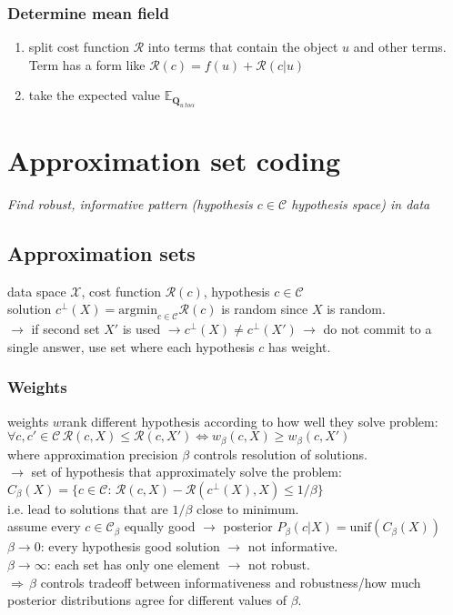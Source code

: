 \documentclass[9pt,parskip]{scrartcl}
\begin{document}
\begin{multicols*}{4}
\subsubsection*{Determine mean field}
\begin{enumerate}
	\item split cost function $\mathcal{R}$ into terms that contain the object $u$ and other terms. Term has a form like $\mathcal{R}(c) = f(u) + \mathcal{R}(c|u)$
	\item take the expected value $\mathbb{E}_{\mathbf{Q}_{u \ to \alpha}}$
\end{enumerate}
\section*{Approximation set coding}
\textit{Find robust, informative pattern (hypothesis $c\in \mathcal{C}$ hypothesis space) in data }
\subsection*{Approximation sets}
data space $\mathcal{X}$, cost function $\mathcal{R}(c)$, hypothesis $c\in \mathcal{C}$ \\
solution $c^{\bot}(X) = \text{argmin}_{c \in \mathcal{C}} \mathcal{R}(c)$ is random since $X$ is random. \\
$\to$ if second set $X'$ is used $\to c^{\bot}(X) \neq c^{\bot}(X') \, \to$ do not commit to a single answer, use set where each hypothesis $c$ has weight. \\
\subsubsection*{Weights}
weights $w$rank different hypothesis according to how well they solve problem: \\
$\forall c, c' \in \mathcal{C} \, \mathcal{R}(c,X) \leq \mathcal{R}(c,X') \Leftrightarrow w_{\beta}(c,X) \geq w_{\beta}(c,X')$ \\
where approximation precision $\beta$ controls resolution of solutions. \\
$\to$ set of hypothesis that approximately solve the problem: \\$C_{\beta}(X)= \{c \in \mathcal{C} : \, \mathcal{R} (c,X) - \mathcal{R}(c^{\bot}(X),X) \leq 1/\beta \}$ \\
i.e. lead to solutions that are $1/\beta$ close to minimum. \\
assume every $c \in \mathcal{C}_{\beta}$ equally good $\to$ posterior $P_{\beta}(c|X) = \text{unif}(C_{\beta}(X))$ \\
$\beta \to 0$: every hypothesis good solution $\to$ not informative. \\
$\beta \to \infty$: each set has only one element $\to$ not robust. \\
$ \Rightarrow \, \beta$ controls tradeoff between informativeness and robustness/how much posterior distributions agree for different values of $\beta$.


\end{multicols*}
\end{document}
